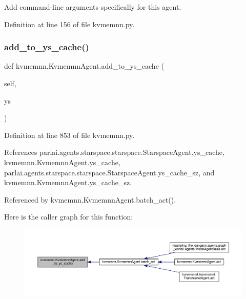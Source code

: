 \begin{DoxyVerb}Add command-line arguments specifically for this agent.\end{DoxyVerb}
 

Definition at line 156 of file kvmemnn.\+py.

\mbox{\label{classkvmemnn_1_1KvmemnnAgent_a0326f13fa94d1e9156e761c14dbcb536}} 
\subsubsection{\texorpdfstring{add\+\_\+to\+\_\+ys\+\_\+cache()}{add\_to\_ys\_cache()}}
{\footnotesize\ttfamily def kvmemnn.\+Kvmemnn\+Agent.\+add\+\_\+to\+\_\+ys\+\_\+cache (\begin{DoxyParamCaption}\item[{}]{self,  }\item[{}]{ys }\end{DoxyParamCaption})}



Definition at line 853 of file kvmemnn.\+py.



References parlai.\+agents.\+starspace.\+starspace.\+Starspace\+Agent.\+ys\+\_\+cache, kvmemnn.\+Kvmemnn\+Agent.\+ys\+\_\+cache, parlai.\+agents.\+starspace.\+starspace.\+Starspace\+Agent.\+ys\+\_\+cache\+\_\+sz, and kvmemnn.\+Kvmemnn\+Agent.\+ys\+\_\+cache\+\_\+sz.



Referenced by kvmemnn.\+Kvmemnn\+Agent.\+batch\+\_\+act().

Here is the caller graph for this function\+:
\nopagebreak
\begin{figure}[H]
\begin{center}
\leavevmode
\includegraphics[width=350pt]{classkvmemnn_1_1KvmemnnAgent_a0326f13fa94d1e9156e761c14dbcb536_icgraph}
\end{center}
\end{figure}
\mbox{\label{classkvmemnn_1_1KvmemnnAgent_a2a2c0f653125850d739b84e0c55e6796}} 

